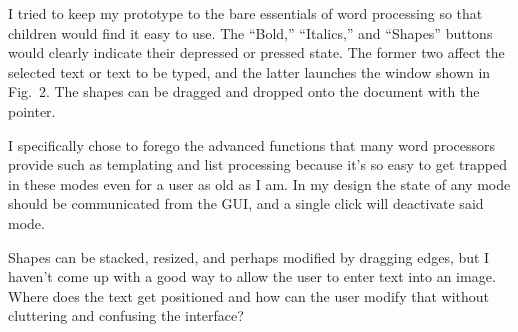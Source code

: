 \documentclass{abrice}
\begin{document}
\noindent
I tried to keep my prototype to the bare essentials of word processing so that
children would find it easy to use. The ``Bold,'' ``Italics,'' and ``Shapes''
buttons would clearly indicate their depressed or pressed state. The former two
affect the selected text or text to be typed, and the latter launches the window
shown in Fig.~2. The shapes can be dragged and dropped onto the document with
the pointer.

I specifically chose to forego the advanced functions that many word processors
provide such as templating and list processing because it's so easy to get
trapped in these modes even for a user as old as I am. In my design the state of
any mode should be communicated from the GUI, and a single click will deactivate
said mode.

Shapes can be stacked, resized, and perhaps modified by dragging edges, but I
haven't come up with a good way to allow the user to enter text into an
image. Where does the text get positioned and how can the user modify that
without cluttering and confusing the interface?
\end{document}
